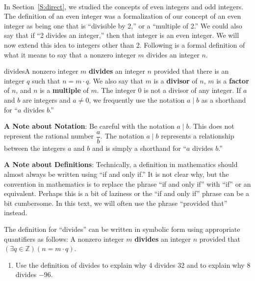 \begin{previewactivity}\label{PA:divisor} \hfill \\
%
In Section~\ref{S:direct}, we studied the concepts of even integers
%
 and odd integers.  The definition of an even integer was a formalization of our concept of an even integer as being one that is ``divisible by 2,'' or a ``multiple of 2.''  We could also say that if ``2 divides an integer,'' then that integer is an even integer.  We will now extend this idea to integers other than 2.  Following is a formal definition of what it means to say that a nonzero integer $m$ divides an integer $n$.

\begin{defbox}{divides}{A nonzero integer $m$  \textbf{divides}
%
 an integer  $n$  provided that there is an integer  $q$  such that  $n = m \cdot q$.  We also say that  $m$  is a \textbf{divisor}
%
 of  $n$, $m$ is a \textbf{factor}
%
 of $n$, and $n$  is a \textbf{multiple}
%
 of  $m$.  The integer 0 is not a divisor of any integer.  If $a$ and $b$ are integers and $a \ne 0$, we frequently use the notation $a \mid b$ as a shorthand for ``$a$ divides $b$.''}
\label{sym:divides}%
\end{defbox}
%
\noindent
\textbf{A Note about Notation}:  Be careful with the notation $a \mid b$.  This does not represent the rational number  $\dfrac{a}{b}$.  The notation  $a \mid b$  represents a relationship between the integers  
$a$  and  $b$  and is simply a shorthand for ``$a$  divides  $b$.''

\newpar
\textbf{A Note about Definitions}:  Technically, a definition in mathematics should almost always be written using ``if and only if.''  It is not clear why, but the convention in mathematics is to replace the phrase ``if and only if'' with ``if'' or an equivalent.  Perhaps this is a bit of laziness or the ``if and only if'' phrase can be a bit cumbersome.  In this text, we will often use the phrase ``provided that'' instead.

The definition for ``divides'' can be written in symbolic form using appropriate quantifiers as follows:
A nonzero integer  $m$  \textbf{divides} an integer  $n$  provided that $\left( {\exists q \in \mathbb{Z}} \right)\left( {n = m \cdot q} \right)$.
%
\begin{enumerate}
  \item Use the definition of divides to explain why 4 divides 32 and to explain why 8 divides $-96$.
%


\end{enumerate}
\end{previewactivity}

